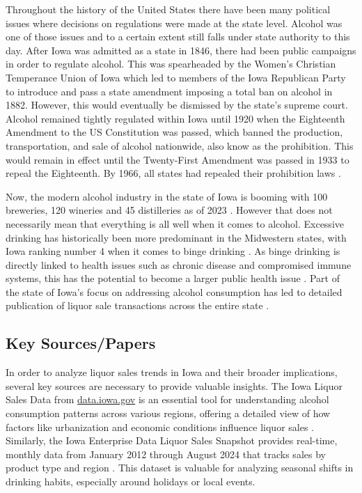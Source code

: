 \documentclass{article}
\begin{document}
Throughout the history of the United States there have been many political issues where decisions on regulations were made at the state level. Alcohol was one of those issues and to a certain extent still falls under state authority to this day. After Iowa was admitted as a state in 1846, there had been public campaigns in order to regulate alcohol. This was spearheaded by the Women's Christian Temperance Union of Iowa which led to members of the Iowa Republican Party to introduce and pass a state amendment imposing a total ban on alcohol \cite{kutz2023} in 1882. However, this would eventually be dismissed by the state's supreme court. Alcohol remained tightly regulated within Iowa  until 1920 when the Eighteenth Amendment to the US Constitution was passed, which banned the production, transportation, and sale of alcohol nationwide, also know as the prohibition. This would remain in effect until the Twenty-First Amendment was passed in 1933 to repeal the Eighteenth. By 1966, all states had repealed their prohibition laws \cite{hist2009}. 

Now, the modern alcohol industry in the state of Iowa is booming with 100 breweries, 120 wineries and 45 distilleries as of 2023 \cite{kutz2023}. However that does not necessarily mean that everything is all well when it comes to alcohol. Excessive drinking has historically been more predominant in the Midwestern states, with Iowa ranking number 4 when it comes to binge drinking \cite{axios2024}. As binge drinking is directly linked to health issues such as chronic disease and compromised immune systems, this has the potential to become a larger public health issue \cite{axios2024}. Part of the state of Iowa's focus on addressing alcohol consumption has led to detailed publication of liquor sale transactions across the entire state \cite{iowa_liquor_sales_data}. 

\subsection{Key Sources/Papers}
In order to analyze liquor sales trends in Iowa and their broader implications, several key sources are necessary to provide valuable insights. The Iowa Liquor Sales Data from \url{data.iowa.gov} is an essential tool for understanding alcohol consumption patterns across various regions, offering a detailed view of how factors like urbanization and economic conditions influence liquor sales \cite{iowa_liquor_sales_data}. Similarly, the Iowa Enterprise Data Liquor Sales Snapshot provides real-time, monthly data from January 2012 through August 2024 that tracks sales by product type and region \cite{iowa_liquor_sales_snapshot}. This dataset is valuable for analyzing seasonal shifts in drinking habits, especially around holidays or local events.
\end{document}
